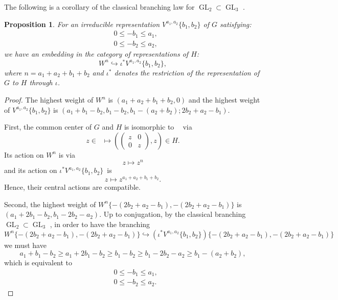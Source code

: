 \documentclass[11pt, a4paper]{amsart}
\theoremstyle{plain}
\newtheorem{proposition}[theorem]{Proposition}
\theoremstyle{definition}
\numberwithin{equation}{section}
\DeclareMathOperator{\GL}{\mathrm{GL}}
\DeclareMathOperator{\Gm}{\mathrm{G_{m}}}
\begin{document}
\par The following is a corollary of the classical branching law for $\GL_2 \subset \GL_3$ \cite[Lemma 8.3.1]{Goodman09}.
\begin{proposition}
    For an irreducible representation $V^{a_1,a_2}\{b_1,b_2\}$ of $G$ satisfying: 
    \begin{align*}
        & 0 \le -b_1 \le a_1, \\
        & 0 \le -b_2 \le a_2, 
    \end{align*}
    we have an embedding in the category of representations of $H$:
    \[                
        W^{n} \hookrightarrow \iota^{*} V^{a_1,a_2}\{b_1,b_2\}, 
    \]
    where $n = a_1 + a_2 + b_1 + b_2$ and $\iota^{*}$ denotes the restriction of the representation of $G$ to $H$ through $\iota$. 
\end{proposition}
\begin{proof}
    The highest weight of $W^{n}$ is $(a_1 + a_2 + b_1 + b_2, 0)$ and the highest weight of $V^{a_1,a_2}\{b_1,b_2\}$ is 
    $(a_1 + b_1 - b_2 , b_1 - b_2, b_1 - (a_2 + b_2); 2b_2 + a_2 - b_1)$. 
    \par First, the common center of $G$ and $H$ is isomorphic to $\Gm$ via 
         \begin{equation*}
             z\in \Gm \mapsto (\begin{pmatrix}
                                z & 0 \\
                                0 & z
                              \end{pmatrix},z)\in H. 
         \end{equation*}
         Its action on $W^{n}$ is via
         \begin{equation*}
              z \mapsto z^{n}
         \end{equation*}
         and its action on $\iota^{*} V^{a_1,a_2}\{b_1,b_2\}$\ is 
         \begin{equation*}
             z \mapsto z^{a_1 + a_2 + b_1 + b_2}. 
         \end{equation*}
         Hence, their central actions are compatible. 
    \par Second, the highest weight of $W^{n}\{-(2b_2 + a_2 - b_1), -(2b_2 + a_2 - b_1)\}$ is $(a_1 + 2b_1 - b_2, b_1 -2b_2 - a_2)$. Up to conjugation, by the classical branching $\GL_2 \subset \GL_3$ \cite[Lemma 8.3.1]{Goodman09}, in order to have the branching 
    \begin{equation*}
         W^{n}\{-(2b_2 + a_2 - b_1), -(2b_2 + a_2 - b_1)\} \hookrightarrow (\iota^{*} V^{a_1,a_2}\{b_1,b_2\}) \{-(2b_2 + a_2 - b_1), -(2b_2 + a_2 - b_1)\}
    \end{equation*}
    we must have 
    \begin{equation*}
        a_1 + b_1 - b_2 \ge a_1 + 2b_1 - b_2 \ge b_1 - b_2 \ge b_1 -2b_2 -a_2 \ge b_1 - (a_2 + b_2), 
    \end{equation*}
    which is equivalent to 
    \begin{align*}
        & 0 \le -b_1 \le a_1, \\
        & 0 \le -b_2 \le a_2. 
    \end{align*}
\end{proof}
\end{document}
